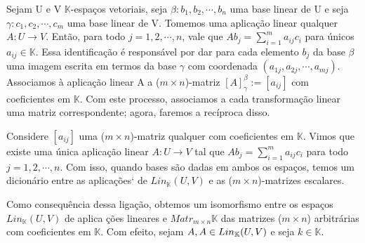     Sejam U e V $\mathbb{K}$-espa\c cos vetoriais, seja $\beta: b_1, b_2, \cdots, b_n$ uma base linear de U e seja 
$\gamma: c_1, c_2, \cdots, c_m$ uma base linear de V. Tomemos uma aplica\c c\~ao linear qualquer $A: U \rightarrow{V}$.
Ent\~ao, para todo $j = 1, 2, \cdots, n$, vale que $Ab_j = \sum\limits_{i=1}^{m}a_{ij}c_i$ para \'unicos $a_{ij}\in\mathbb{K}$.
Essa identifica\c c\~ao \'e respons\'avel por dar para cada elemento $b_j$ da base $\beta$ uma imagem escrita em termos
da base $\gamma$ com coordenada $(a_{1j}, a_{2j}, \cdots, a_{mj})$. Associamos \`a aplica\c c\~ao linear A a 
($m \times n$)-matriz $[A]_{\gamma}^{\beta}:=[a_{ij}]$ com coeficientes em $\mathbb{K}$. Com este processo, 
associamos a cada transforma\c c\~ao linear uma matriz correspondente; agora, faremos a rec\'iproca disso.

    Considere $[a_{ij}]$ uma ($m\times{n}$)-matriz qualquer com coeficientes em $\mathbb{K}$. Vimos que existe uma
\'unica aplica\c c\~ao linear $A:U\rightarrow{V}$ tal que $Ab_j = \sum\limits_{i=1}^{m}a_{ij}c_i$ para todo $j = 1,
2, \cdots, n$. Com isso, quando bases s\~ao dadas em ambos os espa\c cos, temos um dicion\'ario entre as aplica\c c\~oes`
de $Lin_{\mathbb{K}}(U, V)$ e as ($m\times{n}$)-matrizes escalares.

	Como consequ\^encia dessa liga\c c\~ao, obtemos um isomorfismo entre os espa\c cos $Lin_{\mathbb{K}}(U, V)$ de aplica
\c c\~oes lineares e $Matr_{m\times{n}}\mathbb{K}$ das matrizes ($m\times{n}$) arbitr\'arias com coeficientes em $\mathbb{K}.$
Com efeito, sejam $A, A\in{Lin_{\mathbb{K}}({U, V})}$ e seja $k\in\mathbb{K}$.